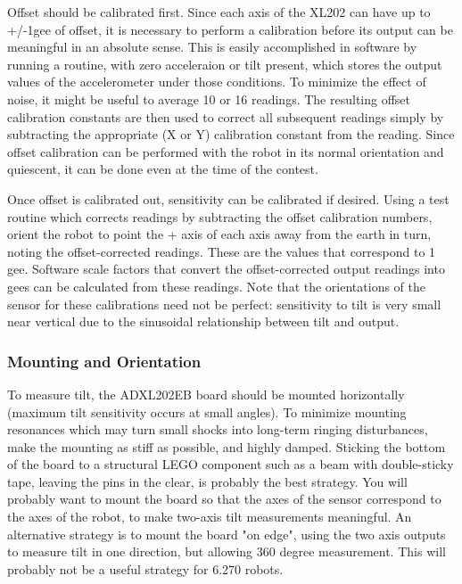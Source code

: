\documentclass{article}
\begin{document}
Offset should be calibrated first.  Since each axis of the XL202 can
have up to +/-1gee of offset, it is necessary to perform a calibration
before its output can be meaningful in an absolute sense.  This is
easily accomplished in software by running a routine, with zero
acceleraion or tilt present, which stores the output values of the
accelerometer under those conditions.  To minimize the effect of
noise, it might be useful to average 10 or 16 readings.  The resulting
offset calibration constants are then used to correct all subsequent
readings simply by subtracting the appropriate (X or Y) calibration
constant from the reading.  Since offset calibration can be performed
with the robot in its normal orientation and quiescent, it can be done
even at the time of the contest. 

Once offset is calibrated out, sensitivity can be calibrated if
desired.  Using a test routine which corrects readings by subtracting
the offset calibration numbers, orient the robot to point the + axis
of each axis away from the earth in turn, noting the offset-corrected
readings.  These are the values that correspond to 1 gee. 
Software scale factors that convert the offset-corrected output
readings into gees can be calculated from these readings.  Note that
the orientations of the sensor for these calibrations need not be
perfect:  sensitivity to tilt is very small near vertical due to the
sinusoidal relationship between tilt and output. 

\subsubsection{Mounting and Orientation}

To measure tilt, the ADXL202EB board should be mounted horizontally
(maximum tilt sensitivity occurs at small angles).  To minimize
mounting resonances which may turn small shocks into long-term ringing
disturbances, make the mounting as stiff as possible, and highly
damped.  Sticking the bottom of the board to a structural LEGO
component such as a beam with double-sticky tape, leaving the pins in
the clear, is probably the best strategy.  You will probably want to
mount the board so that the axes of the sensor correspond to the axes
of the robot, to make two-axis tilt measurements meaningful.  An
alternative strategy is to mount the board "on edge", using the two
axis outputs to measure tilt in one direction, but allowing 360 degree
measurement.  This will probably not be a useful strategy for 6.270
robots. 
\end{document}
